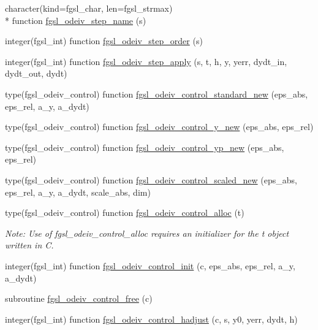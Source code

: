 \begin{DoxyCompactItemize}
\item 
character(kind=fgsl\-\_\-char, len=fgsl\-\_\-strmax) \\*
function \hyperlink{ode_8finc_a1266ca2607d99bd8f30801f7c5837f6b}{fgsl\-\_\-odeiv\-\_\-step\-\_\-name} (s)
\item 
integer(fgsl\-\_\-int) function \hyperlink{ode_8finc_ad473f673ac73701a32499c4f728c0ec0}{fgsl\-\_\-odeiv\-\_\-step\-\_\-order} (s)
\item 
integer(fgsl\-\_\-int) function \hyperlink{ode_8finc_a0447a8399777f24077e870ca2e3a2618}{fgsl\-\_\-odeiv\-\_\-step\-\_\-apply} (s, t, h, y, yerr, dydt\-\_\-in, dydt\-\_\-out, dydt)
\item 
type(fgsl\-\_\-odeiv\-\_\-control) function \hyperlink{ode_8finc_a8a7d90fb014f8aafeb3258a3edac66bf}{fgsl\-\_\-odeiv\-\_\-control\-\_\-standard\-\_\-new} (eps\-\_\-abs, eps\-\_\-rel, a\-\_\-y, a\-\_\-dydt)
\item 
type(fgsl\-\_\-odeiv\-\_\-control) function \hyperlink{ode_8finc_a1bf14333a561bcc24ac68aa26f69330d}{fgsl\-\_\-odeiv\-\_\-control\-\_\-y\-\_\-new} (eps\-\_\-abs, eps\-\_\-rel)
\item 
type(fgsl\-\_\-odeiv\-\_\-control) function \hyperlink{ode_8finc_a99432f111e5ae998c654c70d6c4196a7}{fgsl\-\_\-odeiv\-\_\-control\-\_\-yp\-\_\-new} (eps\-\_\-abs, eps\-\_\-rel)
\item 
type(fgsl\-\_\-odeiv\-\_\-control) function \hyperlink{ode_8finc_aeb584d23ceb54d815721a1a1a28171c5}{fgsl\-\_\-odeiv\-\_\-control\-\_\-scaled\-\_\-new} (eps\-\_\-abs, eps\-\_\-rel, a\-\_\-y, a\-\_\-dydt, scale\-\_\-abs, dim)
\item 
type(fgsl\-\_\-odeiv\-\_\-control) function \hyperlink{ode_8finc_aa135d17ea4a41614a6ac9789c11e220c}{fgsl\-\_\-odeiv\-\_\-control\-\_\-alloc} (t)
\begin{DoxyCompactList}\small\item\em Note\-: Use of fgsl\-\_\-odeiv\-\_\-control\-\_\-alloc requires an initializer for the t object written in C. \end{DoxyCompactList}\item 
integer(fgsl\-\_\-int) function \hyperlink{ode_8finc_a78a741026ae34107fa82e510868530b7}{fgsl\-\_\-odeiv\-\_\-control\-\_\-init} (c, eps\-\_\-abs, eps\-\_\-rel, a\-\_\-y, a\-\_\-dydt)
\item 
subroutine \hyperlink{ode_8finc_a8cc3184bf7c70b2ff108dea05763b452}{fgsl\-\_\-odeiv\-\_\-control\-\_\-free} (c)
\item 
integer(fgsl\-\_\-int) function \hyperlink{ode_8finc_a2792840e81747e88bf03c8ef0689699d}{fgsl\-\_\-odeiv\-\_\-control\-\_\-hadjust} (c, s, y0, yerr, dydt, h)

\end{DoxyCompactItemize}
